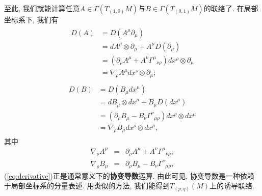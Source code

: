 至此, 我们就能计算任意$A\in \varGamma(T_{(1, 0)}M)$与$B\in \varGamma(T_{(0, 1)}M)$的联络了. 在局部坐标系下, 我们有
\begin{eqnarray}\begin{aligned}
    D(A)&=D(A^\mu\partial_\mu)\\
    &=dA^\mu\otimes\partial_\mu+A^{\mu}D(\partial_\mu)\\
    &=(\partial_{\rho}A^\mu+A^{\nu}{\varGamma^\mu}_{\nu\rho})dx^\rho{\otimes}\partial_\mu\\
    &=\nabla_{\rho}A^{\mu}dx^\rho{\otimes}\partial_\mu;
\end{aligned}\end{eqnarray}
\begin{eqnarray}\begin{aligned}
    D(B)&=D(B_{\mu}{dx}^\mu)\\
    &=dB_\mu\otimes{dx}^\mu+B_{\mu}D({dx}^\mu)\\
    &=(\partial_{\rho}B_\mu-B_\nu{\varGamma^\nu}_{\mu\rho})dx^\rho{\otimes}dx^\mu\\
    &=\nabla_{\rho}B_{\mu}dx^\rho{\otimes}dx^\mu,
\end{aligned}\end{eqnarray}
其中
\begin{eqnarray}\label{eq:derivative}
  \nabla_{\rho}A^\mu&=&\partial_{\rho}A^\mu+A^{\nu}{\varGamma^\mu}_{\nu\rho};\\
  \nabla_{\rho}B_{\mu}&=&\partial_{\rho}B_\mu-B_\nu{\varGamma^\nu}_{\mu\rho},
\end{eqnarray}
(\ref{eq:derivative})正是通常意义下的\textbf{协变导数}运算. 由此可见, 协变导数是一种依赖于局部坐标系的分量表述. 用类似的方法, 我们能得到$T_{(p, q)}(M)$上的诱导联络.

